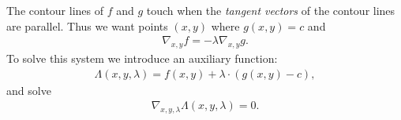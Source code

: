 The contour lines of $f$ and $g$ touch when the \emph{tangent vectors} of the contour lines are parallel.  Thus we want points $(x,y)$ where $g(x,y)=c$ and
\begin{align*}
    \nabla_{x,y} f= -\lambda \nabla_{x,y} g.
\end{align*}
To solve this system we introduce an auxiliary function:
\begin{align*}
    \Lambda(x,y,\lambda) = f(x,y)+\lambda\cdot (g(x,y)-c),
\end{align*}
and solve
\begin{align*}
    \nabla_{x,y,\lambda} \Lambda(x,y,\lambda) = 0.
\end{align*}





